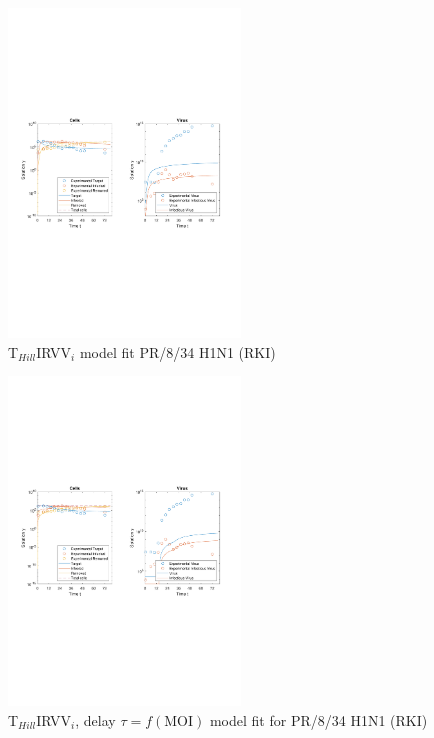\newpage

\begin{figure}[H]
\begin{center}
\includegraphics[width=0.55\textwidth, trim={1cm 9.8cm 1cm 9.5cm}, clip]{D_chapters/6_appendix/4_ValidationRKI/InfectionDepletionModelTHillIRVViMOI0.025log.pdf}
\caption[T$_{Hill}$IRVV$_i$ model fit for PR/8/34 H1N1 (RKI)]%
{T$_{Hill}$IRVV$_i$ model fit PR/8/34 H1N1 (RKI)}
\label{figure:THillIRVViValidationRKI}
\end{center}
\end{figure}

\begin{figure}[H]
\begin{center}
\includegraphics[width=0.55\textwidth, trim={1cm 9.8cm 1cm 9.5cm}, clip]{D_chapters/6_appendix/4_ValidationRKI/InfectionDepletionModelTHillIRVViDelayMOI0.025log.pdf}
\caption[T$_{Hill}$IRVV$_i$, delay $\tau = f(\text{MOI})$ model fit forPR/8/34 H1N1 (RKI)]%
{T$_{Hill}$IRVV$_i$, delay $\tau = f(\text{MOI})$ model fit for PR/8/34 H1N1 (RKI)}
\label{figure:THillIRVViDelayValidationRKI}
\end{center}
\end{figure}

